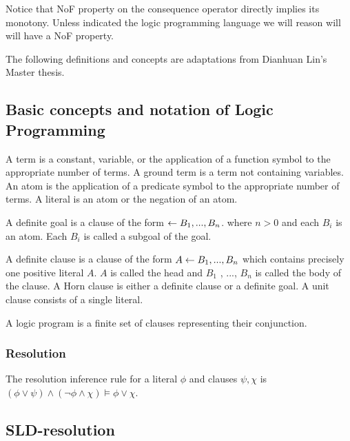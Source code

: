 Notice that NoF property on the consequence operator directly implies its monotony. Unless indicated the logic programming language we will reason will will have a NoF property.

The following definitions and concepts are adaptations from Dianhuan Lin's Master thesis\cite{lin2009}.

\subsection{Basic concepts and notation of Logic Programming\cite{lin2009}}

\begin{defn}
A term is a constant, variable, or the application of a function symbol to the appropriate number of terms. A ground term is a term not containing variables.
An atom is the application of a predicate symbol to the appropriate number of terms. A literal is an atom or the negation of an atom.
\end{defn}

\begin{defn}
A definite goal is a clause of the form
$\leftarrow B_1 , ..., B_n$.
where $n > 0$ and each $B_i$ is an atom.
Each $B_i$ is called a subgoal of the goal.
\end{defn}

\begin{defn}
A definite clause is a clause of the form
$A \leftarrow B_1 , ..., B_n$
which contains precisely one positive literal $A$.
$A$ is called the head and $B_1$ , ..., $B_n$ is called the body of the clause.
A Horn clause is either a definite clause or a definite goal.
A unit clause consists of a single literal.
\end{defn}

\begin{defn}
A logic program is a finite set of clauses representing their conjunction.
\end{defn}

\subsubsection{Resolution\cite{kimber2011}}
The resolution inference rule for a literal $\phi$ and clauses $\psi, \chi$ is
$(\phi \vee \psi) \wedge (\neg \phi \wedge \chi) \models \phi \vee \chi$.

\subsection{SLD-resolution\cite{lin2009}}

